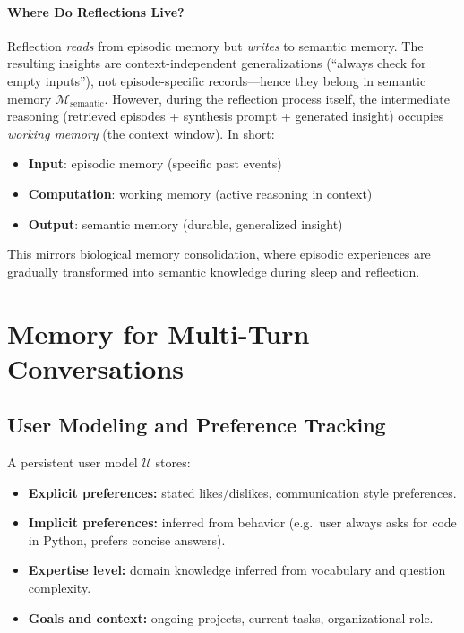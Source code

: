 \paragraph{Where Do Reflections Live?}
\label{where-do-reflections-live}

Reflection \emph{reads} from episodic memory but \emph{writes} to semantic memory. The resulting insights are context-independent generalizations (``always check for empty inputs''), not episode-specific records---hence they belong in semantic memory $\mathcal{M}_\text{semantic}$. However, during the reflection process itself, the intermediate reasoning (retrieved episodes + synthesis prompt + generated insight) occupies \emph{working memory} (the context window). In short:

\begin{itemize}
  \item \textbf{Input}: episodic memory (specific past events)
  \item \textbf{Computation}: working memory (active reasoning in context)
  \item \textbf{Output}: semantic memory (durable, generalized insight)
\end{itemize}

This mirrors biological memory consolidation, where episodic experiences are gradually transformed into semantic knowledge during sleep and reflection.

\section{Memory for Multi-Turn Conversations}
\label{sec:memory-multiturn}

\subsection{User Modeling and Preference Tracking}
\label{user-modeling-and-preference-tracking}

A persistent user model $\mathcal{U}$ stores:

\begin{itemize}
  \item \textbf{Explicit preferences:} stated likes/dislikes, communication style preferences.
  \item \textbf{Implicit preferences:} inferred from behavior (e.g.~user always asks for code in Python, prefers concise answers).
  \item \textbf{Expertise level:} domain knowledge inferred from vocabulary and question complexity.
  \item \textbf{Goals and context:} ongoing projects, current tasks, organizational role.
\end{itemize}

